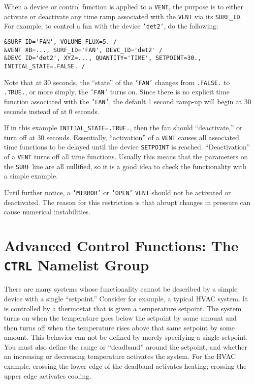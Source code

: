\documentclass[11pt]{book}
\newcommand{\ct}{\tt\small}
\begin{document}
When a device or control function is applied to a {\ct VENT}, the purpose is to either activate or deactivate any time ramp associated with
the {\ct VENT} via its {\ct SURF\_ID}. For example, to control a fan with the device {\ct 'det2'}, do the following:

\footnotesize
\begin{verbatim}
&SURF ID='FAN', VOLUME_FLUX=5. /
&VENT XB=..., SURF_ID='FAN', DEVC_ID='det2' /
&DEVC ID='det2', XYZ=..., QUANTITY='TIME', SETPOINT=30., INITIAL_STATE=.FALSE. /
\end{verbatim}
\normalsize

\noindent
Note that at 30 seconds, the ``state'' of the {\ct 'FAN'} changes from {\ct .FALSE.} to {\ct .TRUE.}, or more simply, the {\ct 'FAN'} turns on. Since there
is no explicit time function associated with the {\ct 'FAN'}, the default 1 second ramp-up will begin at 30 seconds instead of at 0 seconds.

If in this example {\ct INITIAL\_STATE=.TRUE.}, then the fan should ``deactivate,'' or turn off at 30 seconds. Essentially, ``activation'' of a {\ct VENT} causes all associated
time functions to be delayed until the device {\ct SETPOINT} is reached. ``Deactivation'' of a {\ct VENT} turns off all time functions. Usually this means
that the parameters on the {\ct SURF} line are all nullified, so it is a good idea to check the functionality with a simple example.


\begin{warning}
Until further notice, a {\ct 'MIRROR'} or {\ct 'OPEN'} {\ct VENT} should not be activated or deactivated.
The reason for this restriction is that abrupt changes in pressure can cause numerical instabilities.
\end{warning}



\clearpage

\section{Advanced Control Functions: The \texorpdfstring{{\tt CTRL}}{CTRL} Namelist Group}
\label{info:CTRL} 

There are many systems whose functionality cannot be described by a simple device with a single ``setpoint.''
Consider for example, a typical HVAC system.  It is controlled by a thermostat that is given a temperature setpoint.
The system turns on when the temperature goes below the setpoint by some
amount and then turns off when the temperature rises above that same setpoint by some amount.
This behavior can not be defined by merely specifying a single setpoint.
You must also define the range or ``deadband'' around the setpoint, and whether an
increasing or decreasing temperature activates the system.  For the HVAC example, crossing the
lower edge of the deadband activates heating; crossing the upper edge activates cooling.
\end{document}
